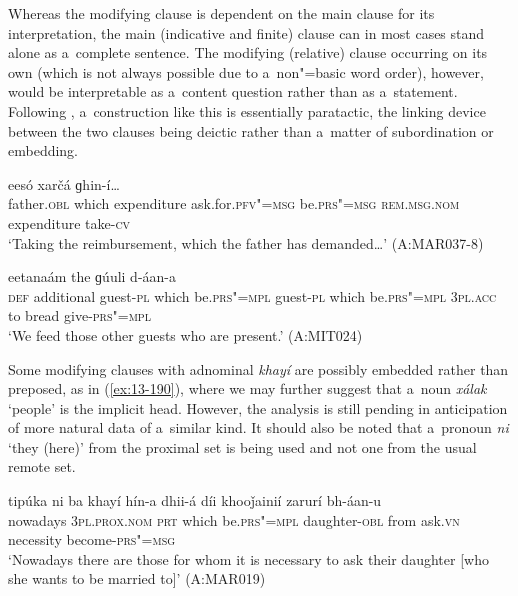 Whereas the modifying clause is dependent on the main clause for its interpretation, the main (indicative and finite) clause can in most cases stand alone as a~complete sentence. The modifying (relative) clause occurring on its own (which is not always possible due to a~non"=basic word order), however, would be interpretable as a~content question rather than as a~statement. Following \citet[182]{givon2001b}, a~construction like this is essentially paratactic, the linking device between the two clauses being deictic rather than a~matter of subordination or embedding.

\begin{exe}
\ex
\label{ex:13-188}
  eesó xarčá ɡhin-í{\ldots}  \\
father.\textsc{obl} which expenditure ask.for.\textsc{pfv"=msg} be.\textsc{prs"=msg} \textsc{rem.msg.nom} expenditure take-\textsc{cv} \\
\glt `Taking the reimbursement, which the father has demanded{\ldots}' (A:MAR037-8)

\ex
\label{ex:13-189}
eetanaám the ɡúuli d-áan-a \\
\textsc{def} additional guest-\textsc{pl} which be.\textsc{prs"=mpl} guest-\textsc{pl} which be.\textsc{prs"=mpl} \textsc{3pl.acc} to bread give-\textsc{prs"=mpl} \\
\glt `We feed those other guests who are present.' (A:MIT024) 
\end{exe}

Some modifying clauses with adnominal \textit{khayí} are possibly embedded rather than preposed, as in (\ref{ex:13-190}), where we may further suggest that a~noun \textit{xálak} `people' is the implicit head. However, the analysis is still pending in anticipation of more natural data of a~similar kind. It should also be noted that a~pronoun \textit{ni} `they (here)' from the proximal set is being used and not one from the usual remote set.

\begin{exe}
\ex
\label{ex:13-190}
\gll tipúka ni ba khayí hín-a  dhii-á díi khooǰainií zarurí bh-áan-u \\
nowadays \textsc{3pl.prox.nom} \textsc{prt} which be.\textsc{prs"=mpl}  daughter-\textsc{obl} from ask.\textsc{vn} necessity become-\textsc{prs"=msg} \\
\glt `Nowadays there are those for whom it is necessary to ask their daughter [who she wants to be married to]' (A:MAR019) 
\end{exe}

